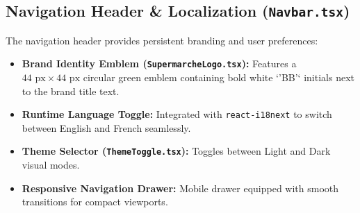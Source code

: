 \documentclass[11pt,a4paper]{article}
\begin{document}
\subsection{Navigation Header \& Localization (\texttt{Navbar.tsx})}
The navigation header provides persistent branding and user preferences:
\begin{itemize}
    \item \textbf{Brand Identity Emblem (\texttt{SupermarcheLogo.tsx}):} Features a $44\text{ px} \times 44\text{ px}$ circular green emblem containing bold white `'BB'` initials next to the brand title text.
    \item \textbf{Runtime Language Toggle:} Integrated with \texttt{react-i18next} to switch between English and French seamlessly.
    \item \textbf{Theme Selector (\texttt{ThemeToggle.tsx}):} Toggles between Light and Dark visual modes.
    \item \textbf{Responsive Navigation Drawer:} Mobile drawer equipped with smooth transitions for compact viewports.
\end{itemize}
\end{document}
